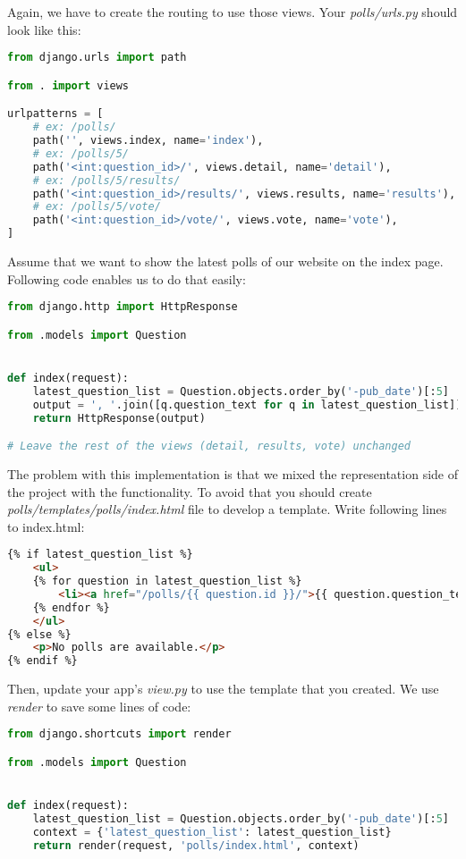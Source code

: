 \documentclass{homework}
\begin{document}
\newpage
Again, we have to create the routing to use those views. Your \textit{polls/urls.py} should look like this:
\begin{lstlisting}[language=Python]
from django.urls import path

from . import views

urlpatterns = [
    # ex: /polls/
    path('', views.index, name='index'),
    # ex: /polls/5/
    path('<int:question_id>/', views.detail, name='detail'),
    # ex: /polls/5/results/
    path('<int:question_id>/results/', views.results, name='results'),
    # ex: /polls/5/vote/
    path('<int:question_id>/vote/', views.vote, name='vote'),
]
\end{lstlisting}
Assume that we want to show the latest polls of our website on the index page. Following code enables us to do that easily:
\begin{lstlisting}[language=python]
from django.http import HttpResponse

from .models import Question


def index(request):
    latest_question_list = Question.objects.order_by('-pub_date')[:5]
    output = ', '.join([q.question_text for q in latest_question_list])
    return HttpResponse(output)

# Leave the rest of the views (detail, results, vote) unchanged
\end{lstlisting}
The problem with this implementation is that we mixed the representation side of the project with the functionality. To avoid that you should create \textit{polls/templates/polls/index.html} file to develop a template. Write following lines to index.html:
\begin{lstlisting}[language=HTML]
{% if latest_question_list %}
    <ul>
    {% for question in latest_question_list %}
        <li><a href="/polls/{{ question.id }}/">{{ question.question_text }}</a></li>
    {% endfor %}
    </ul>
{% else %}
    <p>No polls are available.</p>
{% endif %}
\end{lstlisting}
Then, update your app's \textit{view.py} to use the template that you created. We use \textit{render} to save some lines of code:
\begin{lstlisting}[language=Python]
from django.shortcuts import render

from .models import Question


def index(request):
    latest_question_list = Question.objects.order_by('-pub_date')[:5]
    context = {'latest_question_list': latest_question_list}
    return render(request, 'polls/index.html', context)
\end{lstlisting}
 
\end{document}
